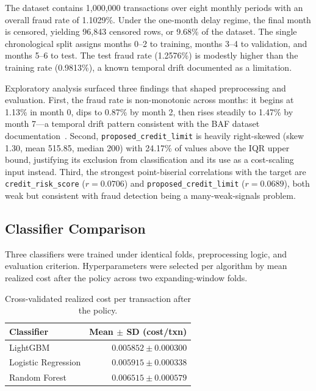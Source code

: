 \documentclass[conference]{IEEEtran}
\begin{document}
The dataset contains 1,000,000 transactions over eight monthly periods
with an overall fraud rate of 1.1029\%. Under the one-month delay regime,
the final month is censored, yielding 96,843 censored rows, or 9.68\% of
the dataset. The single chronological split assigns months 0--2 to
training, months 3--4 to validation, and months 5--6 to test. The test
fraud rate (1.2576\%) is modestly higher than the training rate (0.9813\%),
a known temporal drift documented as a limitation.

Exploratory analysis surfaced three findings that shaped preprocessing and
evaluation. First, the fraud rate is non-monotonic across months: it begins
at 1.13\% in month 0, dips to 0.87\% by month 2, then rises steadily to
1.47\% by month 7---a temporal drift pattern consistent with the BAF
dataset documentation~\cite{jesus2022}. Second,
\texttt{proposed\_credit\_limit} is heavily right-skewed (skew 1.30, mean
515.85, median 200) with 24.17\% of values above the IQR upper bound,
justifying its exclusion from classification and its use as a cost-scaling
input instead. Third, the strongest point-biserial correlations with the
target are \texttt{credit\_risk\_score} ($r=0.0706$) and
\texttt{proposed\_credit\_limit} ($r=0.0689$), both weak but consistent
with fraud detection being a many-weak-signals problem.

\subsection{Classifier Comparison}

Three classifiers were trained under identical folds, preprocessing logic,
and evaluation criterion. Hyperparameters were selected per algorithm by
mean realized cost after the policy across two expanding-window folds.

\begin{table}[!t]
\caption{Cross-validated realized cost per transaction after the policy.}
\label{tab:cv}
\centering
\begin{tabular}{lr}
\toprule
Classifier & Mean $\pm$ SD (cost/txn) \\
\midrule
LightGBM & $0.005852 \pm 0.000300$ \\
Logistic Regression & $0.005915 \pm 0.000338$ \\
Random Forest & $0.006515 \pm 0.000579$ \\
\bottomrule
\end{tabular}
\end{table}
\end{document}
